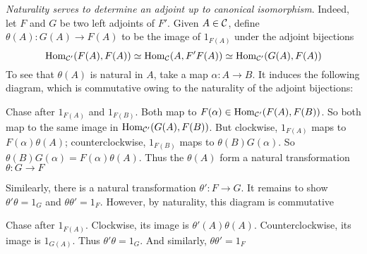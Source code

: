 \documentclass[11pt]{article}
\begin{document}
\emph{Naturality serves to determine an adjoint up to canonical isomorphism}.
Indeed, let \(F\) and \(G\) be two left adjoints of \(F'\). Given
\(A\in\mathcal{C}\), define \(\theta(A):G(A)\to F(A)\) to be the image of \(1_{F(A)}\)
under the adjoint bijections
\begin{equation*}
\operatorname{Hom}_{\mathcal{C}'}(F(A),F(A))\simeq\operatorname{Hom}_{\mathcal{C}}(A,F'F(A))\simeq\operatorname{Hom}_{\mathcal{C}'}(G(A),F(A))
\end{equation*}
To see that \(\theta(A)\) is natural in \(A\), take a map \(\alpha:A\to B\). It induces
the following diagram, which is commutative owing to the naturality of the
adjoint bijections:
\begin{center}
\end{center}

Chase after \(1_{F(A)}\) and \(1_{F(B)}\). Both map to
\(F(\alpha)\in\operatorname{Hom}_{\mathcal{C}'}(F(A),F(B))\). So both map to the same image in
\(\operatorname{Hom}_{\mathcal{C}'}(G(A),F(B))\). But clockwise, \(1_{F(A)}\) maps to
\(F(\alpha)\theta(A)\); counterclockwise, \(1_{F(B)}\) maps to \(\theta(B)G(\alpha)\). So
\(\theta(B)G(\alpha)=F(\alpha)\theta(A)\). Thus the \(\theta(A)\) form a natural transformation
\(\theta:G\to F\)

Similearly, there is a natural transformation \(\theta':F\to G\). It remains
to show \(\theta'\theta=1_G\) and \(\theta\theta'=1_F\). However, by
naturality, this diagram is commutative
\begin{center}
\end{center}
Chase after \(1_{F(A)}\). Clockwise, its image is \(\theta'(A)\theta(A)\).
Counterclockwise, its image is \(1_{G(A)}\). Thus \(\theta'\theta=1_G\). And
similarly, \(\theta\theta'=1_F\)
\end{document}
